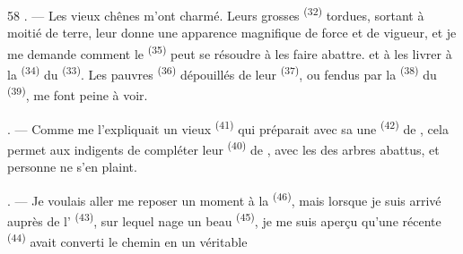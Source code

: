 \begin{VUpage}[60]{58}
. --- Les vieux chênes m'ont charmé. Leurs grosses\nl
{} \textsuperscript{(32)} tordues, sortant à moitié de terre, leur\nl
donne une apparence magnifique de force et de\nl
vigueur, et je me demande comment le \cc
{} \textsuperscript{(35)} peut se résoudre à les faire abattre. et à les\nl
livrer à la  \textsuperscript{(34)} du  \textsuperscript{(33)}. Les pauvres\nl
{} \textsuperscript{(36)} dépouillés de leur  \textsuperscript{(37)}, ou fendus\nl
par la  \textsuperscript{(38)} du  \textsuperscript{(39)}, me font peine à\nl
voir.

. --- Comme me l'expliquait un vieux \cc
{} \textsuperscript{(41)} qui préparait avec sa  une  \textsuperscript{(42)}\nl
de , cela permet aux indigents de compléter\nl
leur  \textsuperscript{(40)} de , avec les  des\nl
arbres abattus, et personne ne s'en plaint.

. --- Je voulais aller me reposer un moment à la\nl
{} \textsuperscript{(46)}, mais lorsque je suis arrivé\nl
auprès de l' \textsuperscript{(43)}, sur lequel nage un beau\nl
{} \textsuperscript{(45)}, je me suis aperçu qu'une récente \cc
{} \textsuperscript{(44)} avait converti le chemin en un véritable
\parplein
\end{VUpage}

